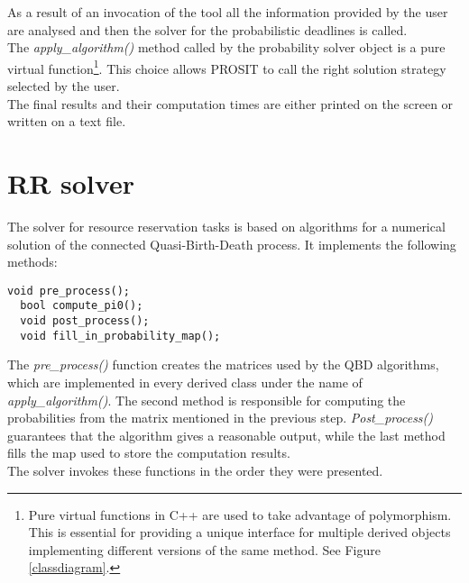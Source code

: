As a result of an invocation of the tool all the information provided by the user are analysed and then the solver for the probabilistic deadlines is called.\\ 
The \emph{apply\_algorithm()} method called by the probability solver object is a pure virtual function\footnote{Pure virtual functions in C++ are used to take advantage of polymorphism. This is essential for providing a unique interface for multiple derived objects implementing different versions of the same method. See Figure \ref{classdiagram}.}. This choice allows PROSIT to call the right solution strategy selected by the user.\\
The final results and their computation times are either printed on the screen or written on a text file.

\section{RR solver}
The solver for resource reservation tasks is based on algorithms for a numerical solution of the connected Quasi-Birth-Death process. It implements the following methods:
\begin{lstlisting}[frame=bt]
  void pre_process();
  bool compute_pi0();
  void post_process();
  void fill_in_probability_map();
\end{lstlisting}

The \emph{pre\_process()} function creates the matrices used by the QBD algorithms, which are implemented in every derived class under the name of \emph{apply\_algorithm()}. The second method is responsible for computing the probabilities from the matrix mentioned in the previous step. \emph{Post\_process()} guarantees that the algorithm gives a reasonable output, while the last method fills the map used to store the computation results.\\
The solver invokes these functions in the order they were presented.

